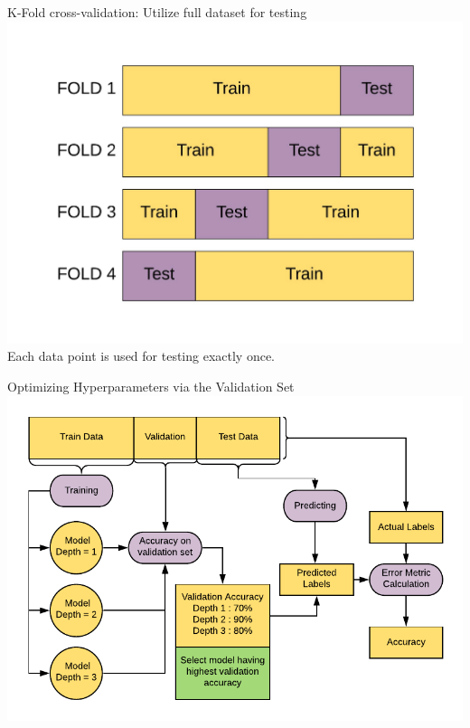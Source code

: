 \documentclass[usenames,dvipsnames]{beamer}
\begin{document}
\begin{frame}{K-Fold cross-validation: Utilize full dataset for testing}
\includegraphics[width = \textwidth]{../assets/cross-validation/diagrams/cross-validation-train-test}
\pause Each data point is used for testing exactly once.
\end{frame}

\begin{frame}{Optimizing Hyperparameters via the Validation Set}
\includegraphics[width = \textwidth]{../assets/cross-validation/diagrams/validation-workflow}
\end{frame}
\end{document}

